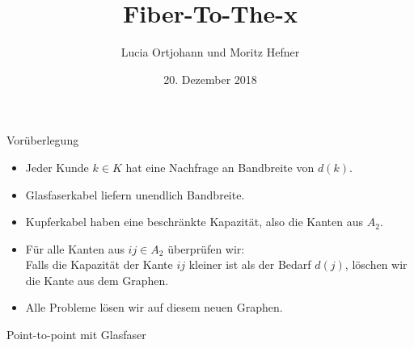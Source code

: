 \documentclass{beamer}
\title[Projekt 2]{Fiber-To-The-x}
\author{Lucia Ortjohann und Moritz Hefner}
\institute[]{Netzwerkoptimierung in der Praxis}
\date{20. Dezember 2018}
\begin{document}
	\begin{frame} %
		\titlepage
	\end{frame}
	
	\begin{frame}{Vor\"uberlegung}
	\begin{itemize}
		\item Jeder Kunde \(k \in K\) hat  eine Nachfrage an Bandbreite von $d(k)$.
		\item Glasfaserkabel liefern unendlich Bandbreite.
		\item Kupferkabel haben eine beschr\"ankte Kapazit\"at, also die Kanten aus $A_2$.
		\vspace{0.8cm}
		\pause
		\item F\"ur alle Kanten aus $ij \in A_2$ \"uberpr\"ufen wir:\\
		Falls die Kapazit\"at der Kante $ij$ kleiner ist als der Bedarf  $d(j)$,
		l\"oschen wir die Kante aus dem Graphen.
		\item Alle Probleme l\"osen wir auf diesem neuen Graphen. 
	\end{itemize}
		
	\end{frame}
	\begin{frame}{Point-to-point mit Glasfaser}
	\end{frame}
	
\end{document}
